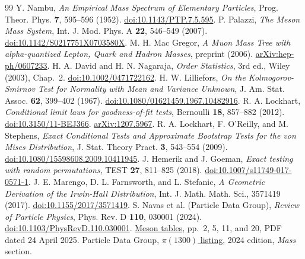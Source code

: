 \documentclass[11pt,a4paper]{article}
\begin{document}
\begin{thebibliography}{99}
 Y. Nambu, \emph{An Empirical Mass Spectrum of Elementary Particles}, Prog. Theor. Phys. \textbf{7}, 595--596 (1952). \href{https://doi.org/10.1143/PTP.7.5.595}{doi:10.1143/PTP.7.5.595}.
 P. Palazzi, \emph{The Meson Mass System}, Int. J. Mod. Phys. A \textbf{22}, 546--549 (2007). \href{https://doi.org/10.1142/S0217751X0703580X}{doi:10.1142/S0217751X0703580X}.
 M. H. Mac Gregor, \emph{A Muon Mass Tree with alpha-quantized Lepton, Quark and Hadron Masses}, preprint (2006). \href{https://arxiv.org/abs/hep-ph/0607233}{arXiv:hep-ph/0607233}.
 H. A. David and H. N. Nagaraja, \emph{Order Statistics}, 3rd ed., Wiley (2003), Chap.~2. \href{https://doi.org/10.1002/0471722162}{doi:10.1002/0471722162}.
 H. W. Lilliefors, \emph{On the Kolmogorov-Smirnov Test for Normality with Mean and Variance Unknown}, J. Am. Stat. Assoc. \textbf{62}, 399--402 (1967). \href{https://doi.org/10.1080/01621459.1967.10482916}{doi:10.1080/01621459.1967.10482916}.
 R. A. Lockhart, \emph{Conditional limit laws for goodness-of-fit tests}, Bernoulli \textbf{18}, 857--882 (2012). \href{https://doi.org/10.3150/11-BEJ366}{doi:10.3150/11-BEJ366}. \href{https://arxiv.org/abs/1207.5967}{arXiv:1207.5967}.
 R. A. Lockhart, F. O'Reilly, and M. Stephens, \emph{Exact Conditional Tests and Approximate Bootstrap Tests for the von Mises Distribution}, J. Stat. Theory Pract. \textbf{3}, 543--554 (2009). \href{https://doi.org/10.1080/15598608.2009.10411945}{doi:10.1080/15598608.2009.10411945}.
 J. Hemerik and J. Goeman, \emph{Exact testing with random permutations}, TEST \textbf{27}, 811--825 (2018). \href{https://doi.org/10.1007/s11749-017-0571-1}{doi:10.1007/s11749-017-0571-1}.
 J. E. Marengo, D. L. Farnsworth, and L. Stefanic, \emph{A Geometric Derivation of the Irwin-Hall Distribution}, Int. J. Math. Math. Sci., 3571419 (2017). \href{https://doi.org/10.1155/2017/3571419}{doi:10.1155/2017/3571419}.
 S. Navas et al. (Particle Data Group), \emph{Review of Particle Physics}, Phys. Rev. D \textbf{110}, 030001 (2024). \href{https://doi.org/10.1103/PhysRevD.110.030001}{doi:10.1103/PhysRevD.110.030001}. \href{https://pdg.lbl.gov/2024/tables/rpp2024-sum-mesons.pdf}{Meson tables}, pp.~2, 5, 11, and 20, PDF dated 24 April 2025.
 Particle Data Group, \href{https://pdg.lbl.gov/2024/listings/rpp2024-list-pi-1300.pdf}{$\pi(1300)$ listing}, 2024 edition, \emph{Mass} section.
\end{thebibliography}
\end{document}
